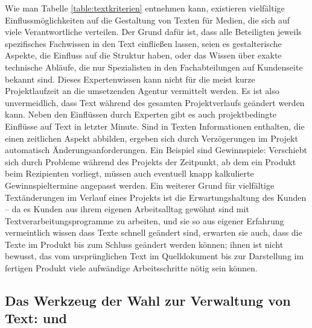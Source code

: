 Wie man Tabelle \ref{table:textkriterien} entnehmen kann, existieren vielfältige Einflussmöglichkeiten auf die Gestaltung von Texten für Medien, die sich auf viele Verantwortliche verteilen. Der Grund dafür ist, dass alle Beteiligten jeweils spezifisches Fachwissen in den Text einfließen lassen, seien es gestalterische Aspekte, die Einfluss auf die Struktur haben, oder das Wissen über exakte technische Abläufe, die nur Spezialisten in den Fachabteilungen auf Kundenseite bekannt sind. Dieses Expertenwissen kann nicht für die meist kurze Projektlaufzeit an die umsetzenden Agentur vermittelt werden. Es ist also unvermeidlich, dass Text während des gesamten Projektverlaufs geändert werden kann. Neben den Einflüssen durch Experten gibt es auch projektbedingte Einflüsse auf Text in letzter Minute. Sind in Texten Informationen enthalten, die einen zeitlichen Aspekt abbilden, ergeben sich durch Verzögerungen im Projekt automatisch Änderungsanforderungen. Ein Beispiel sind Gewinnspiele: Verschiebt sich durch Probleme während des Projekts der Zeitpunkt, ab dem ein Produkt beim Rezipienten vorliegt, müssen auch eventuell knapp kalkulierte Gewinnspieltermine angepasst werden. Ein weiterer Grund für vielfältige Textänderungen im Verlauf eines Projekts ist die Erwartungshaltung des Kunden -- da es Kunden aus ihrem eigenen Arbeitsalltag gewöhnt sind mit Textverarbeitungsprogramme zu arbeiten, und sie so aus eigener Erfahrung vermeintlich wissen dass Texte schnell geändert sind, erwarten sie auch, dass die Texte im Produkt bis zum Schluss geändert werden können; ihnen ist nicht bewusst, das vom ursprünglichen Text im Quelldokument bis zur Darstellung im fertigen Produkt viele aufwändige Arbeitsschritte nötig sein können.


\subsection{Das Werkzeug der Wahl zur Verwaltung von Text:  und }\label{l:werkzeugwahl}

